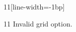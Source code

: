 \documentclass[paper=A4]{ropas-poster}
\begin{document}
\begin{postergrid}{1}{1}[line-width=-1bp]
\begin{posterblock}{1}{1}
Invalid grid option.
\end{posterblock}
\end{postergrid}
\end{document}
